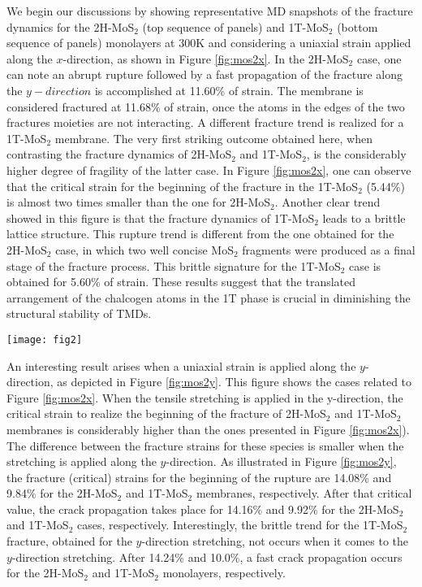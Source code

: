 \documentclass[a4paper,fleqn]{cas-sc}
\begin{document}
We begin our discussions by showing representative MD snapshots of the fracture dynamics for the 2H-MoS$_2$ (top sequence of panels) and 1T-MoS$_2$ (bottom sequence of panels) monolayers at 300K and considering a uniaxial strain applied along the $x$-direction, as shown in Figure \ref{fig:mos2x}. In the 2H-MoS$_2$ case, one can note an abrupt rupture followed by a fast propagation of the fracture along the $y-direction$ is accomplished at 11.60\% of strain. The membrane is considered fractured at 11.68\% of strain, once the atoms in the edges of the two fractures moieties are not interacting. A different fracture trend is realized for a 1T-MoS$_2$ membrane. The very first striking outcome obtained here, when contrasting the fracture dynamics of 2H-MoS$_2$ and 1T-MoS$_2$, is the considerably higher degree of fragility of the latter case. In Figure \ref{fig:mos2x}, one can observe that the critical strain for the beginning of the fracture in the 1T-MoS$_2$ (5.44\%) is almost two times smaller than the one for 2H-MoS$_2$. Another clear trend showed in this figure is that the fracture dynamics of 1T-MoS$_2$ leads to a brittle lattice structure. This rupture trend is different from the one obtained for the 2H-MoS$_2$ case, in which two well concise MoS$_2$ fragments were produced as a final stage of the fracture process. This brittle signature for the 1T-MoS$_2$ case is obtained for 5.60\% of strain. These results suggest that the translated arrangement of the chalcogen atoms in the 1T phase is crucial in diminishing the structural stability of TMDs.                      

\begin{figure*}[pos=ht]
	\centering
	\texttt{[image: fig2]}
	\caption{Representative MD snapshots of the fracture dynamics for the 2H-MoS$_2$ (top sequence of panels) and 1T-MoS$_2$ (bottom sequence of panels) monolayers at 300K and considering a uniaxial strain applied along the $x$-direction.}
	\label{fig:mos2x}
\end{figure*}

An interesting result arises when a uniaxial strain is applied along the $y$-direction, as depicted in Figure \ref{fig:mos2y}. This figure shows the cases related to Figure \ref{fig:mos2x}. When the tensile stretching is applied in the y-direction, the critical strain to realize the beginning of the fracture of 2H-MoS$_2$ and 1T-MoS$_2$ membranes is considerably higher than the ones presented in Figure \ref{fig:mos2x}). The difference between the fracture strains for these species is smaller when the stretching is applied along the $y$-direction. As illustrated in Figure \ref{fig:mos2y}, the fracture (critical) strains for the beginning of the rupture are 14.08\% and 9.84\% for the 2H-MoS$_2$ and 1T-MoS$_2$ membranes, respectively. After that critical value, the crack propagation takes place for 14.16\% and 9.92\% for the 2H-MoS$_2$ and 1T-MoS$_2$ cases, respectively. Interestingly, the brittle trend for the 1T-MoS$_2$ fracture, obtained for the $y$-direction stretching, not occurs when it comes to the $y$-direction stretching. After 14.24\% and 10.0\%, a fast crack propagation occurs for the 2H-MoS$_2$ and 1T-MoS$_2$ monolayers, respectively. 
\end{document}
